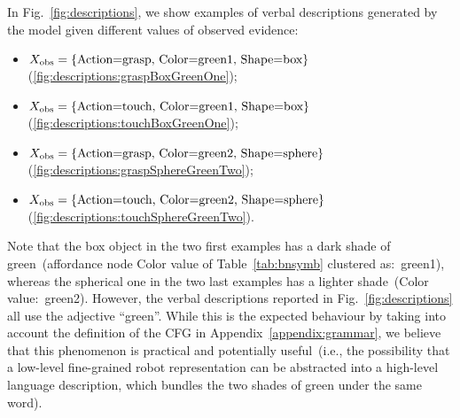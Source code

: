 \newcommand{\evidenceProducingGraspBoxGreenOne}{$\xobs = \{ \text{Action=grasp, Color=green1, Shape=box} \}$}
\newcommand{\evidenceProducingTouchBoxGreenOne}{$\xobs = \{ \text{Action=touch, Color=green1, Shape=box} \}$}
\newcommand{\evidenceProducingGraspSphereGreenTwo}{$\xobs = \{ \text{Action=grasp, Color=green2, Shape=sphere} \}$}
\newcommand{\evidenceProducingTouchSphereGreenTwo}{$\xobs = \{ \text{Action=touch, Color=green2, Shape=sphere} \}$}

In Fig.~\ref{fig:descriptions}, we show examples of verbal descriptions generated by the model given different values of observed evidence:
\begin{itemize}
\item \evidenceProducingGraspBoxGreenOne (\ref{fig:descriptions:graspBoxGreenOne});

\item \evidenceProducingTouchBoxGreenOne (\ref{fig:descriptions:touchBoxGreenOne});

\item \evidenceProducingGraspSphereGreenTwo (\ref{fig:descriptions:graspSphereGreenTwo});

\item \evidenceProducingTouchSphereGreenTwo (\ref{fig:descriptions:touchSphereGreenTwo}).
\end{itemize}
Note that the box object in the two first examples has a dark shade of green~(affordance node Color value of Table~\ref{tab:bnsymb} clustered as:~green1), whereas the spherical one in the two last examples has a lighter shade~(Color value:~green2).
However, the verbal descriptions reported in Fig.~\ref{fig:descriptions} all use the adjective ``green''.
While this is the expected behaviour by taking into account the definition of the \ac{CFG} in Appendix~\ref{appendix:grammar}, we believe that this phenomenon is practical and potentially useful~(i.e., the possibility that a low-level fine-grained robot representation can be abstracted into a high-level language description, which bundles the two shades of green under the same word).

